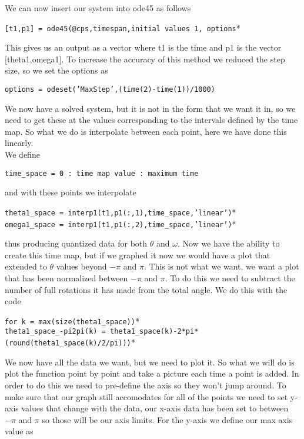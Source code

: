 \documentclass{article}
\begin{document}
We can now insert our system into ode45 as follows

\begin{center}
\texttt{[t1,p1] = ode45(@cps,timespan,initial values 1, options}*
\end{center}							
This gives us an output as a vector where t1 is the time and p1 is the vector [theta1,omega1]. To increase the accuracy of this method we reduced the step size, so we set the options as
\begin{center}
\texttt{options = odeset('MaxStep',(time(2)-time(1))/1000)}
\end{center}
We now have a solved system, but it is not in the form that we want it in, so we need to get these at the values corresponding to the intervals defined by the time map. So what we do is interpolate between each point, here we have done this linearly.\\
We define
\begin{center}
\texttt{time\_space = 0 : time map value : maximum time}
\end{center}
and with these points we interpolate
\begin{center}
\texttt{theta1\_space = interp1(t1,p1(:,1),time\_space,'linear')}* \\
\texttt{omega1\_space = interp1(t1,p1(:,2),time\_space,'linear')}*
\end{center}
thus producing quantized data for both $\theta$ and $\omega$. Now we have the ability to create this time map, but if we graphed it now we would have a plot that extended to $\theta$ values beyond $-\pi$ and $\pi$. This is not what we want, we want a plot that has been normalized between $-\pi$ and $\pi$. To do this we need to subtract the number of full rotations it has made from the total angle. We do this with the code
\begin{center}
\texttt{for k = max(size(theta1\_space))}* \\
\texttt{theta1\_space\_-pi2pi(k) = theta1\_space(k)-2*pi*(round(theta1\_space(k)/2/pi)))}*
\end{center}
We now have all the data we want, but we need to plot it. So what we will do is plot the function point by point and take a picture each time a point is added. In order to do this we need to pre-define the axis so they won't jump around. To make sure that our graph still accomodates for all of the points we need to set y-axis values that change with the data, our x-axis data has been set to between $-\pi$ and $\pi$ so those will be our axis limits. For the y-axis we define our max axis value as
\end{document}
